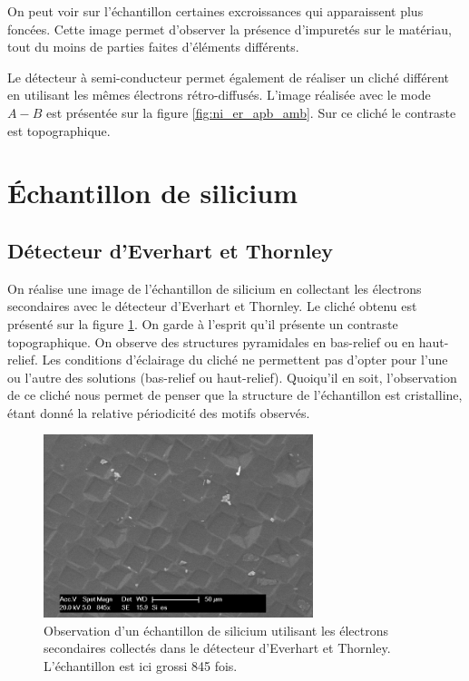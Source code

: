 \documentclass[a4paper,12pt]{article}
\newcommand\ett{Everhart et Thornley\xspace}
\begin{document}
On peut voir sur l'échantillon certaines excroissances qui apparaissent plus foncées. Cette image permet d'observer
la présence d'impuretés sur le matériau, tout du moins de parties faites d'éléments différents.


Le détecteur à semi-conducteur permet également de réaliser un cliché différent en utilisant les mêmes électrons
rétro-diffusés. L'image réalisée avec le mode $A-B$ est présentée sur la figure \ref{fig:ni_er_apb_amb}. Sur ce cliché
le contraste est topographique.


 

\section{Échantillon de silicium}

\subsection{Détecteur d'\ett}

On réalise une image de l'échantillon de silicium en collectant les électrons secondaires avec le détecteur d'\ett.
Le cliché obtenu est présenté sur la figure \ref{fig:si_es}. On garde à l'esprit qu'il présente un contraste topographique.
On observe des structures pyramidales en bas-relief ou en haut-relief. Les conditions d'éclairage du cliché ne permettent
pas d'opter pour l'une ou l'autre des solutions (bas-relief ou haut-relief). Quoiqu'il en soit, l'observation de ce cliché nous permet de penser que la structure de l'échantillon est cristalline, étant donné la relative périodicité des motifs observés.

\begin{figure}[h]
\centering
\includegraphics[width=0.7\textwidth]{images/si_es.png}
\caption{Observation d'un échantillon de silicium utilisant les électrons secondaires collectés dans le détecteur d'\ett. L'échantillon est ici grossi 845 fois.}
\label{fig:si_es}
\end{figure}
\end{document}
